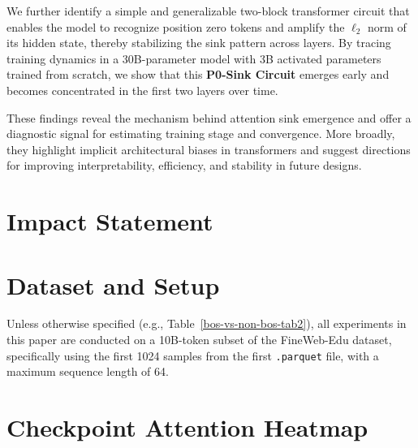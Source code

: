 \documentclass[]{template}
\theoremstyle{plain}
\theoremstyle{definition}
\theoremstyle{remark}
\begin{document}
We further identify a simple and generalizable two-block transformer circuit that enables the model to recognize position zero tokens and amplify the $\ell_2$ norm of its hidden state, thereby stabilizing the sink pattern across layers. By tracing training dynamics in a 30B-parameter model with 3B activated parameters trained from scratch, we show that this \textbf{P0-Sink Circuit} emerges early and becomes concentrated in the first two layers over time.

These findings reveal the mechanism behind attention sink emergence and offer a diagnostic signal for estimating training stage and convergence. More broadly, they highlight implicit architectural biases in transformers and suggest directions for improving interpretability, efficiency, and stability in future designs.

\section*{Impact Statement}

\clearpage





\clearpage
\newpage
\appendix
\onecolumn

\section{Dataset and Setup}

Unless otherwise specified (e.g., Table~\ref{bos-vs-non-bos-tab2}), all experiments in this paper are conducted on a 10B-token subset of the FineWeb-Edu dataset, specifically using the first 1024 samples from the first \texttt{.parquet} file, with a maximum sequence length of 64.

\section{Checkpoint Attention Heatmap}
\label{appendix-ckpt-attn}
\end{document}
